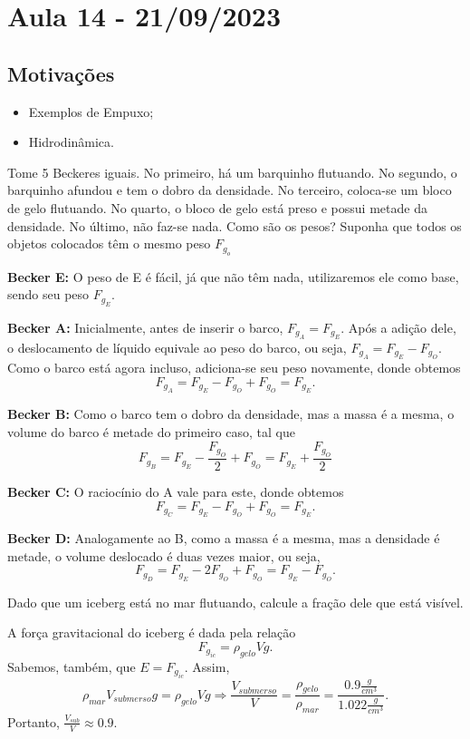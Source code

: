 \documentclass[physicsII_notes.tex]{subfiles}
\begin{document}
\section{Aula 14 - 21/09/2023}
\subsection{Motivações}
\begin{itemize}
	\item Exemplos de Empuxo;
	\item Hidrodinâmica.
\end{itemize}
\begin{example}
	Tome 5 Beckeres iguais. No primeiro, há um barquinho flutuando. No segundo, o barquinho afundou e tem o dobro da densidade. No terceiro,
	coloca-se um bloco de gelo flutuando. No quarto, o bloco de gelo está preso e possui metade da densidade. No último, não faz-se nada. Como são os pesos?
	Suponha que todos os objetos colocados têm o mesmo peso \(F_{g_{o}}\)

	\textbf{Becker E:}
	O peso de E é fácil, já que não têm nada, utilizaremos ele como base, sendo seu peso \(F_{g_{E}}\).

	\textbf{Becker A:}
	Inicialmente, antes de inserir o barco, \(F_{g_{A}} = F_{g_{E}}\). Após a adição dele, o deslocamento de líquido equivale ao peso do barco,
	ou seja, \(F_{g_{A}} = F_{g_{E}}-F_{g_{O}}.\) Como o barco está agora incluso, adiciona-se seu peso novamente, donde obtemos
	\[
		F_{g_{A}} = F_{g_{E}} - F_{g_{O}} + F_{g_{O}} = F_{g_{E}}.
	\]

	\textbf{Becker B:}
	Como o barco tem o dobro da densidade, mas a massa é a mesma, o volume do barco é metade do primeiro caso, tal que
	\[
		F_{g_{B}} = F_{g_{E}} - \frac{F_{g_{O}}}{2} + F_{g_{O}} = F_{g_{E}} + \frac{F_{g_{O}}}{2}
	\]

	\textbf{Becker C:}
	O raciocínio do A vale para este, donde obtemos
	\[
		F_{g_{C}} = F_{g_{E}} - F_{g_{O}} + F_{g_{O}} = F_{g_{E}}.
	\]

	\textbf{Becker D:}
	Analogamente ao B, como a massa é a mesma, mas a densidade é metade, o volume deslocado é duas vezes maior, ou seja,
	\[
		F_{g_{D}} = F_{g_{E}} - 2 F_{g_{O}} + F_{g_{O}} = F_{g_{E}} - F_{g_{O}}.
	\]
\end{example}
\begin{example}
	Dado que um iceberg está no mar flutuando, calcule a fração dele que está visível.

	A força gravitacional do iceberg é dada pela relação
	\[
		F_{g_{ic}} = \rho_{gelo}Vg.
	\]
	Sabemos, também, que \(E = F_{g_{ic}}\). Assim,
	\[
		\rho_{mar}V_{submerso}g = \rho_{gelo}Vg \Rightarrow \frac{V_{submerso}}{V} = \frac{\rho_{gelo}}{\rho_{mar}} = \frac{0.9\frac{g}{cm^{3}}}{1.022\frac{g}{cm^{3}}}.
	\]
	Portanto, \(\frac{V_{sub}}{V}\approx 0.9\).
\end{example}
\end{document}
